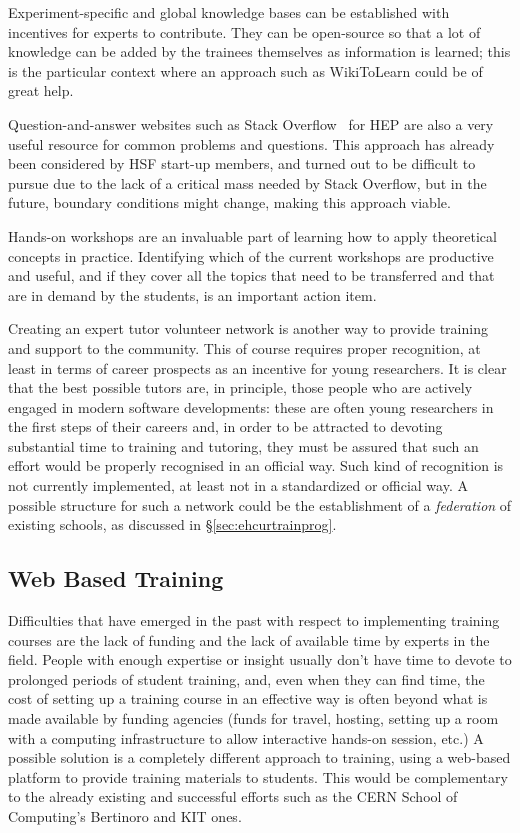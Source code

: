 \documentclass[12pt,a4paper]{article}
\begin{document}
Experiment-specific and global knowledge bases can be established with
incentives for experts to contribute. They can be open-source so that a lot of
knowledge can be added by the trainees themselves as information is learned;
this is the particular context where an approach such as WikiToLearn could be
of great help.

Question-and-answer websites such as Stack Overflow~\cite{Stackoverflow} for HEP are also a very
useful resource for common problems and questions. This approach has already
been considered by HSF start-up members, and turned out to be difficult to
pursue due to the lack of a critical mass needed by Stack Overflow, but in the
future, boundary conditions might change, making this approach viable.

Hands-on workshops are an invaluable part of learning how to apply theoretical
concepts in practice. Identifying which of the current workshops are productive
and useful, and if they cover all the topics that need to be transferred and
that are in demand by the students, is an important action item.

Creating an expert tutor volunteer network is another way to provide training
and support to the community.
This of course requires proper recognition, at least in terms of career
prospects as an incentive for young researchers. It is clear that the best
possible tutors are, in principle, those people who are actively engaged in
modern software developments: these are often young researchers in the
first steps of their careers and, in order to be attracted to devoting
substantial time to training and tutoring, they must be assured that such an
effort would be properly recognised in an official way. Such kind of recognition
is not currently implemented, at least not in a standardized or official way. A
possible structure for such a network could be the establishment of a 
{\em federation} of existing schools, as discussed in \S\ref{sec:ehcurtrainprog}.

\subsection{Web Based Training}

Difficulties that have emerged in the past with respect to implementing training
courses are the lack of funding and the lack of available time by experts in the
field. People with enough expertise or insight usually don't have time to devote
to prolonged periods of student training, and, even when they can find time, the
cost of setting up a training course in an effective way is often beyond what is
made available by funding agencies (funds for travel, hosting, setting up a room
with a computing infrastructure to allow interactive hands-on session, etc.) A
possible solution is a completely different approach to training, using a
web-based platform to provide training materials to students. This would be
complementary to the already existing and successful efforts such as the CERN
School of Computing's Bertinoro and KIT ones. 
\end{document}
